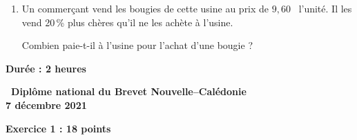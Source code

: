 \documentclass[11pt]{article}
\newcommand{\euro}{\eurologo{}}
\begin{document}
\begin{enumerate}
\emph{On ne tiendra pas compte de la masse, du volume et du prix de Ja mèche dans la suite de l'exercice.}

\medskip

	\begin{enumerate}
		\item Montrer que le volume d'une bougie est d'environ $170$~cm$^3$.
		
		\smallskip
		
On rappelle que le volume d'un cylindre de rayon $r$ et de hauteur $h$ est donné par la formule :

\[V = \pi \times  r^2 \times h.\]

		\item En découpant les cubes de cire d'abeille d'arête 6~cm pour former des bougies cylindriques, la cire perdue est réutilisée pour former à nouveau d'autres cubes de cire d'abeille d'arête 6~cm. 
		
Combien de cubes au départ doit-on découper pour pouvoir reconstituer un cube de cire d'abeille d'arête 6~cm, avec la cire perdue ?
	\end{enumerate}
\item Un commerçant vend les bougies de cette usine au prix de $9,60$~\euro{} l'unité. Il les vend 20\,\% plus chères qu'il ne les achète à l'usine.

Combien paie-t-il à l'usine pour l'achat d'une bougie ?
\end{enumerate}
\newpage
\hypertarget{Caledoniedec}{}

\label{Caledoniedec}

\pagestyle{fancy}
\thispagestyle{empty}

\begin{center}\textbf{Durée : 2 heures}

\vspace{0,5cm}

{\Large\textbf{\decofourleft~Diplôme national du Brevet
Nouvelle--Calédonie~\decofourright}}\\[7pt]
{\Large \textbf{7 décembre 2021}}
\end{center}

\vspace{0,5cm}

\textbf{Exercice 1 : \hfill 18 points}
\end{document}
